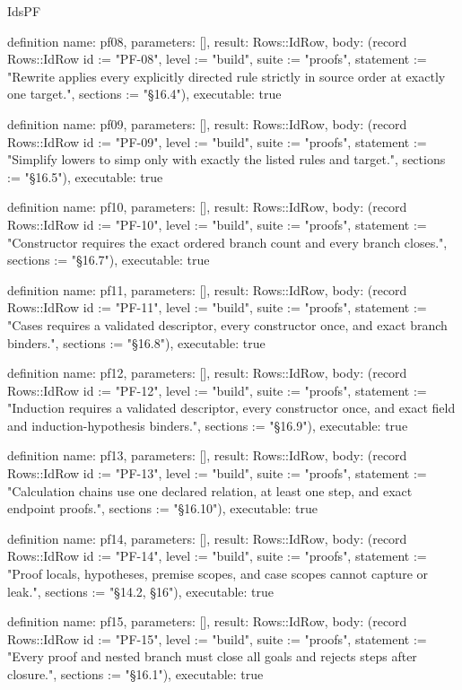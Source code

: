 \begin{lexlean}{IdsPF}
\begin{semanticmodule}
definition{
  name: pf08,
  parameters: [],
  result: Rows::IdRow,
  body: (record Rows::IdRow {id := "PF-08", level := "build", suite := "proofs", statement := "Rewrite applies every explicitly directed rule strictly in source order at exactly one target.", sections := "§16.4"}),
  executable: true
}

definition{
  name: pf09,
  parameters: [],
  result: Rows::IdRow,
  body: (record Rows::IdRow {id := "PF-09", level := "build", suite := "proofs", statement := "Simplify lowers to simp only with exactly the listed rules and target.", sections := "§16.5"}),
  executable: true
}

definition{
  name: pf10,
  parameters: [],
  result: Rows::IdRow,
  body: (record Rows::IdRow {id := "PF-10", level := "build", suite := "proofs", statement := "Constructor requires the exact ordered branch count and every branch closes.", sections := "§16.7"}),
  executable: true
}

definition{
  name: pf11,
  parameters: [],
  result: Rows::IdRow,
  body: (record Rows::IdRow {id := "PF-11", level := "build", suite := "proofs", statement := "Cases requires a validated descriptor, every constructor once, and exact branch binders.", sections := "§16.8"}),
  executable: true
}

definition{
  name: pf12,
  parameters: [],
  result: Rows::IdRow,
  body: (record Rows::IdRow {id := "PF-12", level := "build", suite := "proofs", statement := "Induction requires a validated descriptor, every constructor once, and exact field and induction-hypothesis binders.", sections := "§16.9"}),
  executable: true
}

definition{
  name: pf13,
  parameters: [],
  result: Rows::IdRow,
  body: (record Rows::IdRow {id := "PF-13", level := "build", suite := "proofs", statement := "Calculation chains use one declared relation, at least one step, and exact endpoint proofs.", sections := "§16.10"}),
  executable: true
}

definition{
  name: pf14,
  parameters: [],
  result: Rows::IdRow,
  body: (record Rows::IdRow {id := "PF-14", level := "build", suite := "proofs", statement := "Proof locals, hypotheses, premise scopes, and case scopes cannot capture or leak.", sections := "§14.2, §16"}),
  executable: true
}

definition{
  name: pf15,
  parameters: [],
  result: Rows::IdRow,
  body: (record Rows::IdRow {id := "PF-15", level := "build", suite := "proofs", statement := "Every proof and nested branch must close all goals and rejects steps after closure.", sections := "§16.1"}),
  executable: true
}


\end{semanticmodule}
\end{lexlean}
